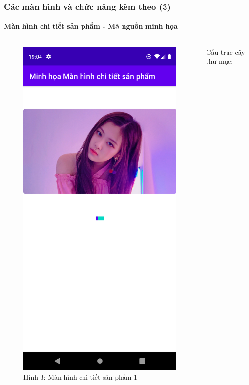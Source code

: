 \documentclass{beamer}
\begin{document}
\begin{frame}
    \frametitle{Các màn hình và chức năng kèm theo (3)}
    \framesubtitle{Màn hình chi tiết sản phẩm - Mã nguồn minh họa}

    \begin{columns}
        \begin{figure}
            \centering
            \includegraphics[height=0.7\textheight]{images/30.png}
            \caption{\centering\tiny{Hình 3: Màn hình chi tiết sản phẩm 1}}

        \end{figure}
        \indent Cấu trúc cây thư mục:
        
    \end{columns}
\end{frame}
\end{document}
